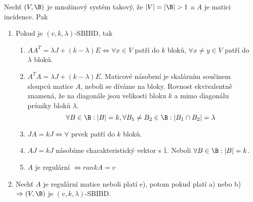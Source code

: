 \begin{theorem}\label{sbibd_equiv}
	Nechť $(V, \B)$ je množinový systém takový, že $|V| = |\B| > 1$ a $A$ je matici incidence.
	Pak
	\begin{enumerate}
		\item Pokud je $(v, k, \lambda)$-SBIBD, tak
		\begin{enumerate}
			\item $AA^T = \lambda J + (k - \lambda)E \iff \forall x \in V$ patří do $k$ bloků, $\forall x \neq y \in V$ patří do $\lambda$ bloků.
			\item $A^TA = \lambda J + (k - \lambda)E$.
				Maticové násobení je skalárním součinem sloupců matice $A$, neboli se díváme na bloky.
				Rovnost ekvivalentně znamená, že na diagonále jsou velikosti bloku $k$ a mimo diagonálu průniky bloků $\lambda$.
				\[ \forall B \in \B: |B| = k, \forall B_1 \ne B_2 \in \B: |B_1 \cap B_2| = \lambda \]
			\item $JA = kJ \iff \forall$ prvek patří do $k$ bloků.
			\item $AJ = kJ$ násobíme charakteristický vektor s $\bar{1}$.
				Neboli $\forall B \in \B: |B| = k$.
			\item $A$ je regulární $\iff rank A = v$
		\end{enumerate}
		\item Nechť $A$ je regulární matice neboli platí e), potom pokud platí a) nebo b) $\Rightarrow (V, \B)$ je $(v, k, \lambda)$-SBIBD.
	\end{enumerate}
\end{theorem}
